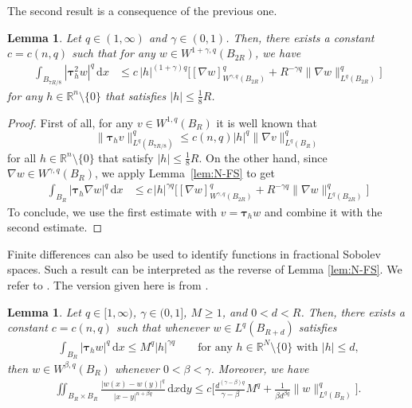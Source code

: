 \documentclass[10pt,letterpaper]{amsart}
\newtheorem{lemma}[theorem]{Lemma}
\theoremstyle{definition}
\numberwithin{theorem}{section}
\numberwithin{equation}{section}
\newcommand{\R}{\ensuremath{\mathbb{R}}}
\newcommand{\1}{\ensuremath{\mathds{1}}}
\newcommand{\dx}{\mathrm{d}x}
\newcommand{\dy}{\mathrm{d}y}
\numberwithin{equation}{section}
\begin{document}
\noindent The second result is a consequence of the previous one.
\begin{lemma}\label{lem:W-1+gamma}
Let $q\in(1,\infty)$ and $\gamma \in(0,1)$. Then, there exists a constant $c=c(n,q)$ such that for any $w\in W^{1+\gamma,q}(B_{2R})$, we have
\begin{align*}
    \int_{B_{7R/8}} |\boldsymbol{\tau}^2_h w|^q \,\dx 
    &\le
    c\,|h|^{(1+\gamma) q} 
    \Big[[\nabla w]^q_{W^{\gamma,q}(B_{2R})} +
    R^{-\gamma q}\|\nabla w\|^q_{L^q(B_{2R})}
    \Big]
\end{align*}
for any  $h\in\R^n\setminus\{0\}$ that satisfies  $|h|\le \frac18R$. 
\end{lemma}
\begin{proof}
    First of all, for any $v\in W^{1,q}(B_R)$ it is well known that
    \[
    \|\boldsymbol{\tau}_h v\|^q_{L^q(B_{7R/8})}\le c(n,q) |h|^q \|\nabla v\|^q_{L^q(B_R)}
    \]
    for all $h\in\R^n\setminus\{0\}$ that satisfy  $|h|\le \frac18R$. On the other hand, since $\nabla w\in W^{\gamma,q}(B_{R})$, we apply Lemma~\ref{lem:N-FS} to get
    \begin{align*}
    \int_{B_{R}} |\boldsymbol{\tau}_h \nabla w|^q \,\dx 
    &\le
    c\,|h|^{\gamma q} 
    \Big[[\nabla w]^q_{W^{\gamma,q}(B_{2R})} +
    R^{-\gamma q}\|\nabla w\|^q_{L^q(B_{2R})}
    \Big]
\end{align*}
To conclude, we use the first estimate with $v=\boldsymbol{\tau}_h w$ and combine it with the second estimate.
\end{proof}


Finite differences can also be used to identify functions in fractional Sobolev spaces. Such a result can be interpreted as the reverse of Lemma \ref{lem:N-FS}. 
We refer to \cite[7.73]{Adams-75}. The version given here is from \cite[Lemma 2.7]{Brasco-Lindgren}. 
\begin{lemma}\label{lem:FS-N}
Let $q\in [1,\infty)$, $\gamma \in(0,1]$, $M\ge 1$, and $0<d<R$. Then, there exists a constant $c=c(n,q)$ such that whenever $w\in L^{q}(B_{R+d})$ satisfies 
\begin{align*}
    \int_{B_R} |\boldsymbol{\tau}_h w|^q \,\dx 
    \le 
    M^q|h|^{\gamma q} 
    \qquad \mbox{for any $h\in\R^N\setminus\{0\}$ with $|h|\le d$,}
\end{align*}
then $w\in W^{\beta ,q}(B_R)$ whenever $0<\beta <\gamma$. Moreover, we have
\begin{align*}
      \iint_{B_R\times B_R}  
    \frac{|w(x)-w(y)|^q}{|x-y|^{n+\beta q}} \,\dx\dy
    \le 
    c\bigg[\frac{d^{(\gamma-\beta)q}}{\gamma-\beta} M^q +
    \frac{1}{\beta d^{\beta q}} \|w\|_{L^q(B_R)}^q\bigg].
\end{align*}
\end{lemma}
\end{document}
